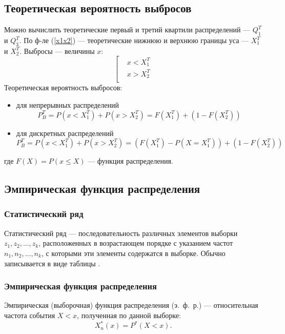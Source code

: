 \documentclass[12pt]{article}
\begin{document}
\subsection{Теоретическая вероятность выбросов}
Можно вычислить теоретические первый и третий квартили распределений
--- $Q_1^T$ и $Q_3^T$. По ф-ле (\ref{x1x2}) --- теоретические нижнюю и верхнюю границы уса --- $X_1^T$ и $X_2^T$. Выбросы --- величины $x$:
\[
	\left[
		\begin{aligned}
			& x < X_1^T\\
			& x > X_2^T\\
		\end{aligned}
	\right.
\]
Теоретическая вероятность выбросов:
\begin{itemize}
	\item для непрерывных распределений
	\begin{equation}
		P^T_B = P(x < X_1^T) + P(x > X_2^T) = F(X_1^T) + (1 - F(X_2^T))
		\label{continuousP}
	\end{equation}
	\item для дискретных распределений
	\begin{equation}
		P^T_B = P(x < X_1^T) + P(x > X_2^T) = (F(X^T_1) - P(X = X^T_1)) + (1-F(X^T_2))
		\label{discreteP}
	\end{equation}
\end{itemize}
где $F(X) = P(x \leqslant X)$ --- функция распределения.
\subsection{Эмпирическая функция распределения}
\subsubsection{Статистический ряд}
Статистический ряд --- последовательность различных элементов выборки $z_1, z_2, \dots, z_k$, расположенных в возрастающем порядке с указанием частот $n_1, n_2, \dots, n_k$, с которыми эти элементы содержатся в выборке. Обычно записывается в виде таблицы \cite{theory}.
\subsubsection{Эмпирическая функция распределения}
Эмпирическая (выборочная) функция распределения (э.~ф.~р.) --- относительная частота события $X < x$, полученная по данной выборке:
\[
	X_n^*(x) = P^*(X < x).
\]
\end{document}
